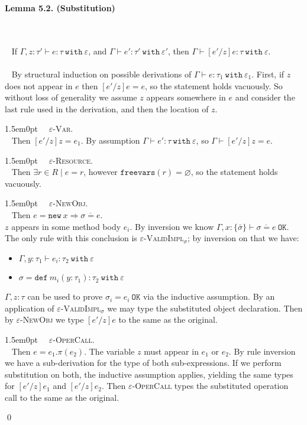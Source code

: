 \documentclass{llncs}
\newcommand{\keywadj}[1]{\mathtt{#1}}
\newcommand{\keyw}[1]{\keywadj{#1}~}
\newcommand{\thm}[3]{
	\begin{large}
		\bf{#1}
	\end{large} \\\\
	\fbox{Statement.} ~ #2
	\fbox{Proof.}~ #3 \qed
}
\newcommand{\proofcase}[2]{
	\begin{adjustwidth}{1.5em}{0pt}
		\fbox{Case.}~~#1. \\ ~#2
	\end{adjustwidth}
}
\begin{document}
\thm{Lemma 5.2. (Substitution)}
{If $\Gamma, z : \tau' \vdash e : \tau~\keyw{with} \varepsilon$, and $\Gamma \vdash e' : \tau'~\keyw{with} \varepsilon'$, then $\Gamma \vdash [e'/z]e : \tau~\keyw{with} \varepsilon$. \\\\}
{By structural induction on possible derivations of $\Gamma \vdash e : \tau_1~\keyw{with} \varepsilon_1$. First, if $z$ does not appear in $e$ then $[e'/z]e = e$, so the statement holds vacuously. So without loss of generality we assume $z$ appears somewhere in $e$ and consider the last rule used in the derivation, and then the location of $z$. \\

	\proofcase{\textsc{$\varepsilon$-Var}} {
		Then $[e'/z]z = e_1$. By assumption $\Gamma \vdash e' : \tau~\keyw{with} \varepsilon$, so $\Gamma \vdash [e'/z]z = e$. \\
	}
		
	\proofcase{\textsc{$\varepsilon$-Resource}} {
		Then $\exists r \in R \mid e = r$, however $\keywadj{freevars}(r) = \varnothing$, so the statement holds vacuously.\\
	}
		
	\proofcase{\textsc{$\varepsilon$-NewObj}} {
		Then $e = \keyw{new} x \Rightarrow \overline{\sigma =e}$. \\
		
		\noindent
		 $z$ appears in some method body $e_i$. By inversion we know $\Gamma, x : \{ \bar \sigma \} \vdash \overline {\sigma = e}~\keywadj{OK}$. The only rule with this conclusion is \textsc{$\varepsilon$-ValidImpl$_\sigma$}; by inversion on that we have:
		 \begin{itemize}
		 	\item $\Gamma, y : \tau_1 \vdash e_i : \tau_2~\keyw{with} \varepsilon$
		 	\item $\sigma = \keyw{def} m_i(y : \tau_1) : \tau_2~\keyw{with} \varepsilon$
		\end{itemize}
	$\Gamma, z : \tau$ can be used to prove $\sigma_i = e_i~\keywadj{OK}$ via the inductive assumption. By an application of \textsc{$\varepsilon$-ValidImpl$_\sigma$} we may type the substituted object declaration. Then by \textsc{$\varepsilon$-NewObj} we type $[e'/z]e$ to the same as the original.\\
	}
	
	\proofcase{\textsc{$\varepsilon$-OperCall}} {
		Then $e = e_1.\pi(e_2)$. The variable $z$ must appear in $e_1$ or $e_2$. By rule inversion we have a sub-derivation for the type of both sub-expressions. If we perform substitution on both, the inductive assumption applies, yielding the same types for $[e'/z]e_1$ and $[e'/z]e_2$. Then \textsc{$\varepsilon$-OperCall} types the substituted operation call to the same as the original. \\
	}

}
\end{document}
